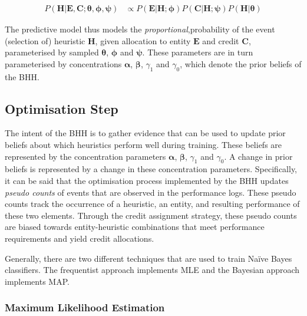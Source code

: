 \begin{equation}
	\label{eq:bhh:selection_mechanism:predictive_model_prop_to}
	\begin{split}
		P(\boldsymbol{H} \vert \boldsymbol{E}, \boldsymbol{C};  \boldsymbol{\theta}, \boldsymbol{\phi}, \boldsymbol{\psi}) &\propto P(\boldsymbol{E} \vert \boldsymbol{H};  \boldsymbol{\phi})  P(\boldsymbol{C} \vert \boldsymbol{H};  \boldsymbol{\psi}) P(\boldsymbol{H} \vert \boldsymbol{\theta})
	\end{split}
\end{equation}

The predictive model thus models the \textit{proportional},probability of the event (selection of) heuristic $\boldsymbol{H}$, given allocation to entity $\boldsymbol{E}$ and credit $\boldsymbol{C}$, parameterised by sampled $\boldsymbol{\theta}$, $\boldsymbol{\phi}$ and $\boldsymbol{\psi}$. These parameters are in turn parameterised by concentrations $\boldsymbol{\alpha}$, $\boldsymbol{\beta}$, $\gamma_{1}$ and $\gamma_{0}$, which denote the prior beliefs of the \acs{BHH}.

\subsection{Optimisation Step}\label{sec:bhh:optimisation_step}

The intent of the \acs{BHH} is to gather evidence that can be used to update prior beliefs about which heuristics perform well during training. These beliefs are represented by the concentration parameters $\boldsymbol{\alpha}$, $\boldsymbol{\beta}$, $\gamma_{1}$ and $\gamma_{0}$. A change in prior beliefs is represented by a change in these concentration parameters. Specifically, it can be said that the optimisation process implemented by the \acs{BHH} updates \textit{pseudo counts} of events that are observed in the performance logs. These pseudo counts track the occurrence of a heuristic, an entity, and resulting performance of these two elements. Through the credit assignment strategy, these pseudo counts are biased towards entity-heuristic combinations that meet performance requirements and yield credit allocations.

Generally, there are two different techniques that are used to train Naïve Bayes classifiers. The frequentist approach implements \acs{MLE} and the Bayesian approach implements \acs{MAP}.


\subsubsection{Maximum Likelihood Estimation}\label{sec:bhh:optimisation_step:mle}

